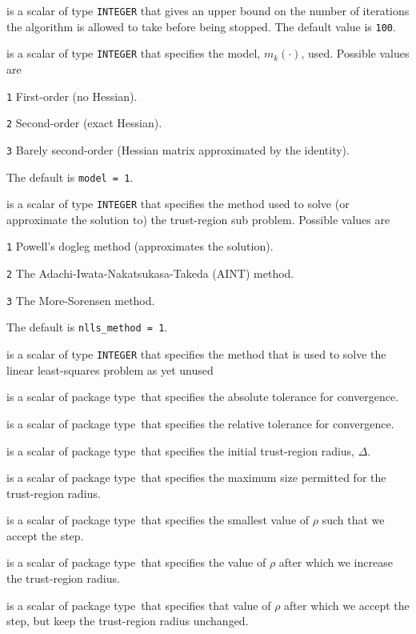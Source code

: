 \documentclass{hslspec}
\newcommand{\scalarinteger}{is a scalar of type {\tt INTEGER} }
\newcommand{\scalarreal}{is a scalar of package type\ }
\begin{document}
\begin{description}

 \scalarinteger that gives an upper bound on the number
of iterations the algorithm is allowed to take before being stopped.  The default value is {\tt 100}.

 \scalarinteger that specifies the model, $m_k(\cdot)$, used.  Possible values are 
\begin{description}
  \item{\tt 1} First-order (no Hessian).
  \item{\tt 2} Second-order (exact Hessian).
  \item{\tt 3} Barely second-order (Hessian matrix approximated by the identity).
\end{description}
The default is {\tt model = 1}.

 \scalarinteger that specifies the method used to solve 
(or approximate the solution to) the trust-region sub problem.  Possible values are
\begin{description}
  \item{\tt 1} Powell's dogleg method (approximates the solution).
  \item{\tt 2} The Adachi-Iwata-Nakatsukasa-Takeda (AINT) method.
  \item{\tt 3} The More-Sorensen method.
\end{description}
The default is {\tt nlls\_method = 1}.

 \scalarinteger that specifies the method that is used to solve the linear least-squares problem {\color{red} as yet unused}

 \scalarreal that specifies the absolute tolerance for convergence.

 \scalarreal that specifies the relative tolerance for convergence.

 \scalarreal that specifies the initial trust-region radius, $\Delta$.

 \scalarreal that specifies the maximum size permitted for the trust-region radius.

 \scalarreal that specifies the smallest value of $\rho$ such that we accept the step.  

 \scalarreal that specifies the value of $\rho$ after which we increase the trust-region radius.

 \scalarreal that specifies that value of $\rho$ after which we accept the step, 
but keep the trust-region radius unchanged.


\end{description}
\end{document}

